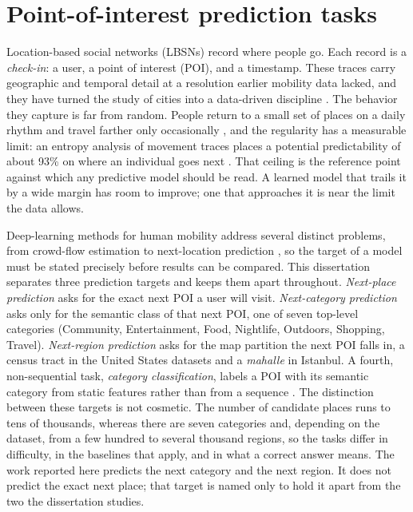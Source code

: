 
\section{Point-of-interest prediction tasks}
\label{sec:fund:tasks}

Location-based social networks (LBSNs) record where people go. Each record is a
\emph{check-in}: a user, a point of interest (POI), and a timestamp. These traces
carry geographic and temporal detail at a resolution earlier mobility data lacked,
and they have turned the study of cities into a data-driven discipline
\cite{silva2019urbancomputing}. The behavior they capture is far from random. People
return to a small set of places on a daily rhythm and travel farther only
occasionally \cite{cho2011gowalla}, and the regularity has a measurable limit: an
entropy analysis of movement traces places a potential predictability of about
93\% on where an individual goes next \cite{song2010limits}. That ceiling is the
reference point against which any predictive model should be read. A learned model
that trails it by a wide margin has room to improve; one that approaches it is near
the limit the data allows.

Deep-learning methods for human mobility address several distinct problems, from
crowd-flow estimation to next-location prediction \cite{luca2021mobilitysurvey}, so
the target of a model must be stated precisely before results can be compared. This
dissertation separates three prediction targets and keeps them apart throughout.
\emph{Next-place prediction} asks for the exact next POI a user will visit.
\emph{Next-category prediction} asks only for the semantic class of that next POI,
one of seven top-level categories (Community, Entertainment, Food, Nightlife,
Outdoors, Shopping, Travel). \emph{Next-region prediction} asks for the map
partition the next POI falls in, a census tract in the United States datasets and a
\emph{mahalle} in Istanbul. A fourth, non-sequential task, \emph{category
classification}, labels a POI with its semantic category from static features rather
than from a sequence \cite{Xu2023}. The distinction between these targets is not
cosmetic. The number of candidate places runs to tens of thousands, whereas there
are seven categories and, depending on the dataset, from a few hundred to several
thousand regions, so the tasks differ in difficulty, in the baselines that apply,
and in what a correct answer means. The work reported here predicts the next
category and the next region. It does not predict the exact next place; that target
is named only to hold it apart from the two the dissertation studies.

